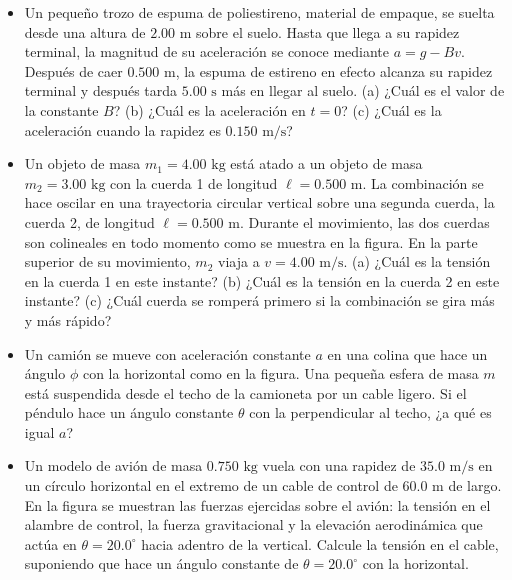 \documentclass[11pt,a4paper]{article}
\begin{document}
\begin{itemize}
    \item[\textbf{25.}] Un pequeño trozo de espuma de poliestireno, material de empaque, se suelta desde una altura de $2.00 \text{ m}$ sobre el suelo. Hasta que llega a su rapidez terminal, la magnitud de su aceleración se conoce mediante $a = g - Bv$. Después de caer $0.500 \text{ m}$, la espuma de estireno en efecto alcanza su rapidez terminal y después tarda $5.00 \text{ s}$ más en llegar al suelo. (a) ¿Cuál es el valor de la constante $B$? (b) ¿Cuál es la aceleración en $t = 0$? (c) ¿Cuál es la aceleración cuando la rapidez es $0.150 \text{ m/s}$?
    \vspace*{7cm}

    \item[\textbf{26.}] Un objeto de masa $m_1 = 4.00 \text{ kg}$ está atado a un objeto de masa $m_2 = 3.00 \text{ kg}$ con la cuerda 1 de longitud $\ell = 0.500 \text{ m}$. La combinación se hace oscilar en una trayectoria circular vertical sobre una segunda cuerda, la cuerda 2, de longitud $\ell = 0.500 \text{ m}$. Durante el movimiento, las dos cuerdas son colineales en todo momento como se muestra en la figura. En la parte superior de su movimiento, $m_2$ viaja a $v = 4.00 \text{ m/s}$. (a) ¿Cuál es la tensión en la cuerda 1 en este instante? (b) ¿Cuál es la tensión en la cuerda 2 en este instante? (c) ¿Cuál cuerda se romperá primero si la combinación se gira más y más rápido?
    \vspace*{7cm}

    \item[\textbf{27.}] Un camión se mueve con aceleración constante $a$ en una colina que hace un ángulo $\phi$ con la horizontal como en la figura. Una pequeña esfera de masa $m$ está suspendida desde el techo de la camioneta por un cable ligero. Si el péndulo hace un ángulo constante $\theta$ con la perpendicular al techo, ¿a qué es igual $a$?
    \vspace*{6cm}

    \item[\textbf{28.}] Un modelo de avión de masa $0.750 \text{ kg}$ vuela con una rapidez de $35.0 \text{ m/s}$ en un círculo horizontal en el extremo de un cable de control de $60.0 \text{ m}$ de largo. En la figura se muestran las fuerzas ejercidas sobre el avión: la tensión en el alambre de control, la fuerza gravitacional y la elevación aerodinámica que actúa en $\theta = 20.0^\circ$ hacia adentro de la vertical. Calcule la tensión en el cable, suponiendo que hace un ángulo constante de $\theta = 20.0^\circ$ con la horizontal.
    \vspace*{6cm}


\end{itemize}
\end{document}

